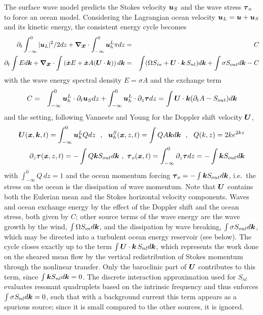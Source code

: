 \documentclass[12pt]{article}
\newcommand{\beq}  { \begin{eqnarray} }
\newcommand{\eeq}  { \end{eqnarray}}
\renewcommand{\v}[1]{{\mbox{\boldmath$ #1 $}}}  %
\newcommand{\p}{{\partial}}
\newcommand{\vn}{{\v \nabla}}
\newcommand{\lk}{\left(}
\newcommand{\rk}{\right)}
\begin{document}
The surface wave model predicts the Stokes velocity $\v u_S$ and the wave stress $\v \tau_o$
to force an ocean model.
Considering the Lagrangian ocean velocity $\v u_L = \v u + \v u_S$ and its kinetic energy,
 the consistent energy cycle becomes 
\beq \label{eq_K}
\p_t \int_{-\infty}^0  |\v u_L|^2/2 dz + \vn_{\v x}  \cdot \int_{-\infty}^0  \v u^L_h  \pi  dz  &=&   C  \\  \label{eq_W}
\p_t  \int E d \v k +  \vn_{\v x}  \cdot  \int \lk  \dot{\v x}   E  + \dot{ \v x}  A (\v U \cdot \v k)  \rk d \v k
   &=& \int (\Omega S_{in} +\v U \cdot \v k \, S_{nl}) d \v k +\int \sigma S_{out}   d \v k   -C  \nonumber
\eeq
with the wave energy spectral density $E = \sigma A$ and the exchange term 
\beq \label{eq_C}
   C&=&  \int_{-\infty}^0  \v u^L_h \cdot   \p_t \v u_S  dz +\int_{-\infty}^0  \v u^L_h  \cdot    \p_z \v \tau  dz 
   = \int  \v U \cdot \v k (\p_t A -S_{out}) d \v k
   \eeq
   and the setting, following Vanneste and Young for the Doppler shift velocity $\v U$,
\beq \label{eq_Q}
  \v U(\v x,\v k,t) = \int_{-\infty}^0 \v u^L_h Q  dz  ~~,~~\v u^S_h(\v x,z,t)  = \int Q A \v k d \v k~~,~~Q(k,z) = 2 k e^{2 kz}    
  \\
\p_z \v \tau(\v x,z,t) = -  \int  Q    \v k S_{out} d \v k~,~ \v \tau_o(\v x,t) =\int_{-\infty}^0 \p_z \v \tau dz =- \int   \v k S_{out} d \v k
\eeq
with $\int_{-\infty}^0 Q \, dz = 1$ and the ocean momentum forcing $ \v \tau_o =-\int   \v k S_{out} d \v k$,
i.e.\ the stress on the ocean is the dissipation of wave momentum.
Note that $\v U$ contains both the Eulerian mean and the Stokes horizontal velocity components.
Waves and ocean exchange energy by the effect of the Doppler shift and the ocean stress, both
given by $C$; other source terms of the wave energy are the wave growth by the wind,
$\int \Omega S_{in} d \v k$, and the dissipation by wave breaking, $\int \sigma S_{out} d \v k$,
which may be directed into a turbulent ocean energy reservoir (see below).
The cycle closes exactly up to the term $\int \v U \cdot \v k \, S_{nl} d \v k$, which represents
the work done on the sheared mean flow by the vertical redistribution of Stokes momentum
through the nonlinear transfer. Only the baroclinic part of $\v U$ contributes to this term,
since $\int \v k S_{nl} d \v k = 0$. The discrete interaction approximation used for $S_{nl}$
evaluates resonant quadruplets based on the intrinsic frequency and thus enforces
$\int \sigma S_{nl} d \v k = 0$, such that with a background current this term appears as a
spurious source; since it is small compared to the other sources, it is ignored.
\end{document}
